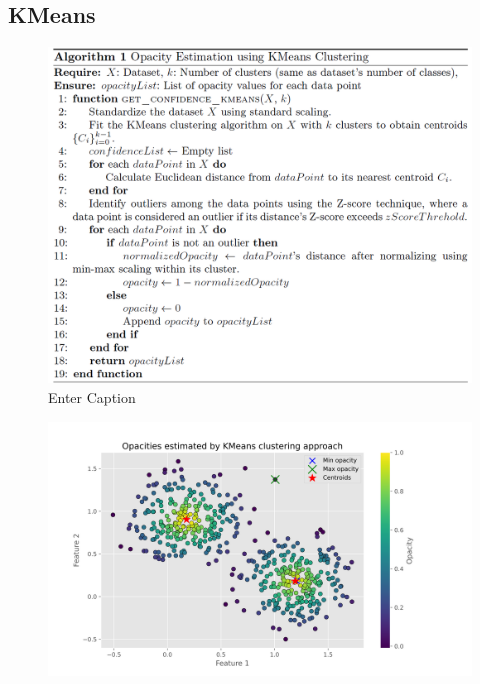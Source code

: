 \documentclass[aspectratio=169]{beamer}
\begin{document}
\subsection{{\rm KMeans}}
\begin{frame}
\begin{figure}
    \centering
    \includegraphics[width=0.68\linewidth]{alg_kmeans_opacity.png}
    \caption{Enter Caption}
    \label{fig:enter-label}
\end{figure}
\end{frame}

\begin{frame}
\begin{figure}
    \centering
    \includegraphics[width=0.78\linewidth]{kmeans_opactiy.png}
    \label{fig:enter-label}
\end{figure}
\end{frame}
\end{document}
